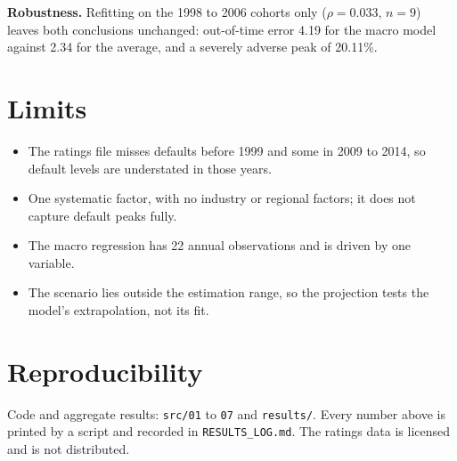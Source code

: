 \documentclass[11pt]{article}
\begin{document}
\textbf{Robustness.} Refitting on the 1998 to 2006 cohorts only ($\rho = 0.033$, $n = 9$) leaves both conclusions unchanged: out-of-time error 4.19 for the macro model against 2.34 for the average, and a severely adverse peak of 20.11\%.

\section{Limits}

\begin{itemize}
\item The ratings file misses defaults before 1999 and some in 2009 to 2014, so default levels are understated in those years.
\item One systematic factor, with no industry or regional factors; it does not capture default peaks fully.
\item The macro regression has 22 annual observations and is driven by one variable.
\item The scenario lies outside the estimation range, so the projection tests the model's extrapolation, not its fit.
\end{itemize}

\section{Reproducibility}

Code and aggregate results: \texttt{src/01} to \texttt{07} and \texttt{results/}. Every number above is printed by a script and recorded in \texttt{RESULTS\_LOG.md}. The ratings data is licensed and is not distributed.
\end{document}
